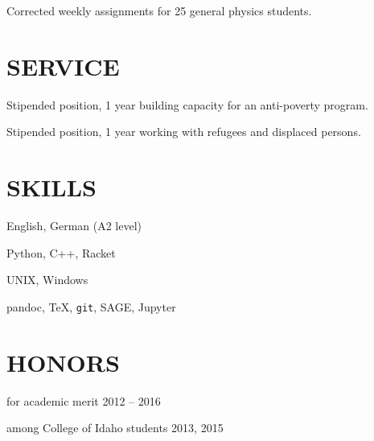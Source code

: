 \documentclass[margin]{res}
\begin{document}
\begin{resume}
\begin{details}
\item{Corrected weekly assignments for 25 general physics students.}
\end{details} 

\section{SERVICE}

\begin{details}
\item{Stipended position, 1 year building capacity for an anti-poverty program.}
\end{details}

\begin{details}
\item{Stipended position, 1 year working with refugees and displaced persons.}
\end{details}

\section{SKILLS}
\begin{multicols}{2} \parskip=0pt

\begin{details}
\item English, German (A2 level)
\end{details}

\begin{details}
\item Python, C++, Racket
\end{details}

\begin{details}
\item UNIX, Windows
\end{details}   

\begin{details}
\item pandoc, \TeX, \texttt{git}, SAGE, Jupyter
\end{details}   

\end{multicols}

\section{HONORS} \vspace{10pt}

\begin{description}[noitemsep,topsep=0pt]
\item[Heritage Scholarship] for academic merit \hfill 2012 -- 2016
\item[Top Putnam Score] among College of Idaho students \hfill 2013, 2015
\end{description}

\end{resume}
\end{document}
